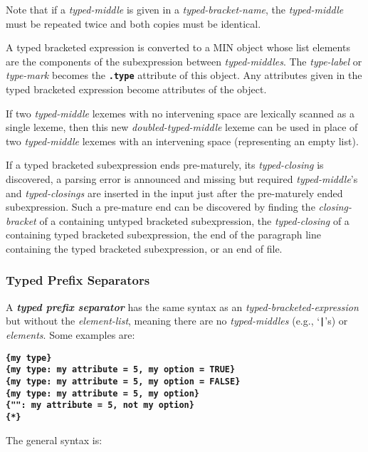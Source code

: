 \documentclass[12pt]{article}
\newcommand{\TT}[1]{{\tt \bfseries #1}}
\newcommand{\key}[1]{{\bf \em #1}\index{#1}}
\begin{document}
Note that if a {\em typed-middle} is given in a {\em typed-bracket-name},
the {\em typed-middle} must be repeated twice and both copies must
be identical.

A typed bracketed expression is converted to a
MIN object whose list elements are the components of the
subexpression between {\em typed-middles}.  The
{\em type-label} or {\em type-mark} becomes the \TT{.type}
attribute of this object.  Any attributes given in the
typed bracketed expression become attributes of the object.

If two {\em typed-middle} lexemes with no intervening space
are lexically scanned as a single lexeme, then this new
{\em doubled-typed-middle} lexeme can be used in place of
two {\em typed-middle} lexemes with an intervening space
(representing an empty list).

If a typed bracketed subexpression ends pre-maturely,
its {\em typed-closing} is discovered, a parsing error is
announced and missing but required {\em typed-middle}'s and {\em typed-closings}
are inserted in the input
just after the pre-maturely ended subexpression.  Such a pre-mature end can be
discovered by finding the {\em closing-bracket} of a containing
untyped bracketed subexpression, the {\em typed-closing}
of a containing typed bracketed subexpression, the end of the paragraph line
containing the typed bracketed subexpression,
or an end of file.

\subsubsection{Typed Prefix Separators}
\label{TYPED-PREFIX-SEPARATORS}

A \key{typed prefix separator}
has the same syntax as an {\em typed-bracketed-expression}
but without the {\em element-list}, meaning there are no
{\em typed-middles} (e.g., `\TT{|}'s) or {\em elements}.
Some examples are:
\begin{center}
\TT{\{my type\}} \\
\TT{\{my type: my attribute = 5, my option = TRUE\}} \\
\TT{\{my type: my attribute = 5, my option = FALSE\}} \\
\TT{\{my type: my attribute = 5, my option\}} \\
\TT{\{"": my attribute = 5, not my option\}} \\
\TT{\{*\}} \\
\end{center}

The general syntax is:
\end{document}
